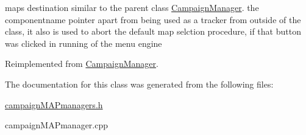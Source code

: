 maps destination similar to the parent class \hyperlink{class_campaign_manager}{Campaign\+Manager}. the componentname pointer apart from being used as a tracker from outside of the class, it also is used to abort the default map selction procedure, if that button was clicked in running of the menu engine 

Reimplemented from \hyperlink{class_campaign_manager_af4ec02e5399f2a7bea50454eedd4ea62}{Campaign\+Manager}.



The documentation for this class was generated from the following files\+:\begin{DoxyCompactItemize}
\item 
\hyperlink{campaign_m_a_pmanagers_8h}{campaign\+M\+A\+Pmanagers.\+h}\item 
campaign\+M\+A\+Pmanager.\+cpp\end{DoxyCompactItemize}
